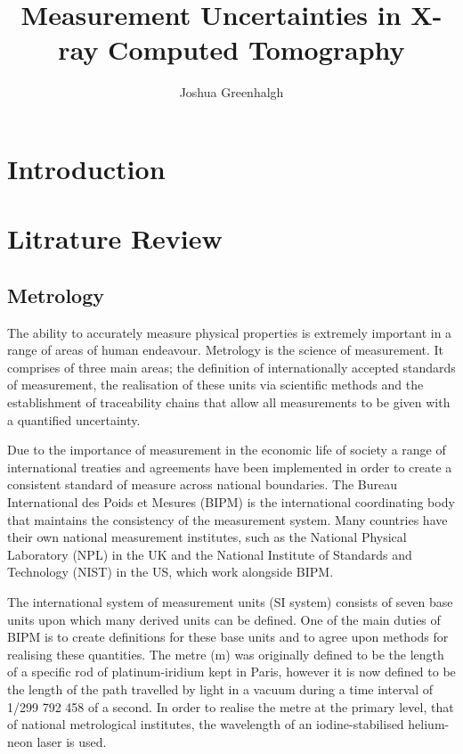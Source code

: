 \documentclass[
  twoside,
  11pt, a4paper,
  footinclude=true,
  headinclude=true,
  cleardoublepage=empty
]{scrbook}
\title{Measurement Uncertainties in X-ray Computed Tomography}
\author{Joshua Greenhalgh}
\begin{document}
\maketitle




\chapter{Introduction}



\chapter{Litrature Review}
\section{Metrology}
The ability to accurately measure physical properties is extremely important in a range of areas of human endeavour. Metrology is the science of measurement. It comprises of three main areas; the definition of internationally accepted standards of measurement, the realisation of these units via scientific methods and the establishment of traceability chains that allow all measurements to be given with a quantified uncertainty.

Due to the importance of measurement in the economic life of society a range of international treaties and agreements have been implemented in order to create a consistent standard of measure across national boundaries. The Bureau International des Poids et Mesures (BIPM) is the international coordinating body that maintains the consistency of the measurement system. Many countries have their own national measurement institutes, such as the National Physical Laboratory (NPL) in the UK and the National Institute of Standards and Technology (NIST) in the US, which work alongside BIPM.

The international system of measurement units (SI system) consists of seven base units upon which many derived units can be defined. One of the main duties of BIPM is to create definitions for these base units and to agree upon methods for realising these quantities. The metre (m) was originally defined to be the length of a specific rod of platinum-iridium kept in Paris, however it is now defined to be the length of the path travelled by light in a vacuum during a time interval of 1/299 792 458 of a second. In order to realise the metre at the primary level, that of national metrological institutes, the wavelength of an iodine-stabilised helium-neon laser is used.
\end{document}
